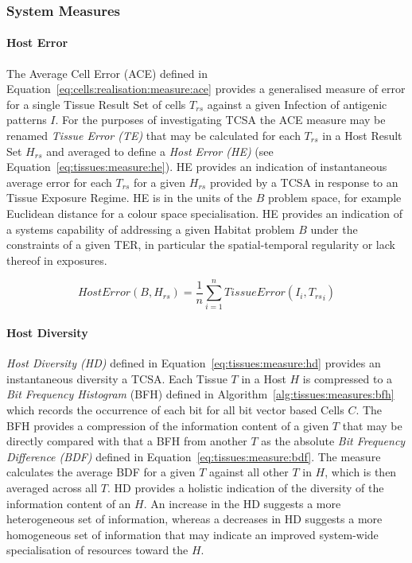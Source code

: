 %
%
\subsubsection{System Measures}

%
%
\paragraph{Host Error}
The Average Cell Error (ACE) defined in Equation~\ref{eq:cells:realisation:measure:ace} provides a generalised measure of error for a single Tissue Result Set of cells $T_{rs}$ against a given Infection of antigenic patterns $I$. For the purposes of investigating TCSA the ACE measure may be renamed \emph{Tissue Error (TE)} that may be calculated for each $T_{rs}$ in a Host Result Set $H_{rs}$ and averaged to define a \emph{Host Error (HE)} (see Equation~\ref{eq:tissues:measure:he}). HE provides an indication of instantaneous average error for each $T_{rs}$ for a given $H_{rs}$ provided by a TCSA in response to an Tissue Exposure Regime. HE is in the units of the $B$ problem space, for example Euclidean distance for a colour space specialisation.
HE provides an indication of a systems capability of addressing a given Habitat problem $B$ under the constraints of a given TER, in particular the spatial-temporal regularity or lack thereof in exposures.


\begin{equation}
	HostError(B, H_{rs}) = \frac{1}{n} \sum_{i=1}^n TissueError(I_i, {T_{rs}}_i)
	\label{eq:tissues:measure:he}
\end{equation}

%
%
\paragraph{Host Diversity}
\emph{Host Diversity (HD)} defined in Equation~\ref{eq:tissues:measure:hd} provides an instantaneous diversity a TCSA. Each Tissue $T$ in a Host $H$ is compressed to a \emph{Bit Frequency Histogram} (BFH) defined in Algorithm~\ref{alg:tissues:measures:bfh} which records the occurrence of each bit for all bit vector based Cells $C$. The BFH provides a compression of the information content of a given $T$ that may be directly compared with that a BFH from another $T$ as the absolute \emph{Bit Frequency Difference (BDF)} defined in Equation~\ref{eq:tissues:measure:bdf}. The measure calculates the average BDF for a given $T$ against all other $T$ in $H$, which is then averaged across all $T$.
HD provides a holistic indication of the diversity of the information content of an $H$. An increase in the HD suggests a more heterogeneous set of information, whereas a decreases in HD suggests a more homogeneous set of information that may indicate an improved system-wide specialisation of resources toward the $H$. 

